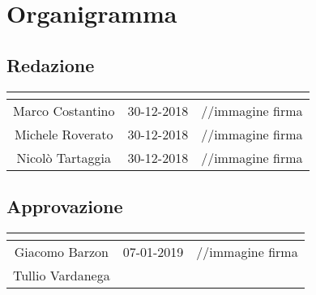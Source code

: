 \section*{Organigramma}

\subsection*{Redazione}
\begin{center}
\renewcommand{\arraystretch}{2}
  \begin{tabular}{| c | c | c |}
    \hline
    \rowcolor{title_row}
    \textbf{\color{title_text}{Nominativo}} & \textbf{\color{title_text}{Data}} & \textbf{\color{title_text}{Firma}} \\ \hline
    Marco Costantino & 30-12-2018 & //immagine firma \\ \hline
    Michele Roverato & 30-12-2018 & //immagine firma \\ \hline
    Nicolò Tartaggia & 30-12-2018 & //immagine firma \\ 
    \hline
  \end{tabular}
\renewcommand{\arraystretch}{1}
\end{center}

\subsection*{Approvazione}
\begin{center}
\renewcommand{\arraystretch}{2}
  \begin{tabular}{| c | c | c |}
    \hline
    \rowcolor{title_row}
    \textbf{\color{title_text}{Nominativo}} & \textbf{\color{title_text}{Data}} & \textbf{\color{title_text}{Firma}} \\ \hline
    Giacomo Barzon & 07-01-2019 & //immagine firma \\ \hline
    Tullio Vardanega &  &  \\
    \hline
  \end{tabular}
\renewcommand{\arraystretch}{1}
\end{center}

